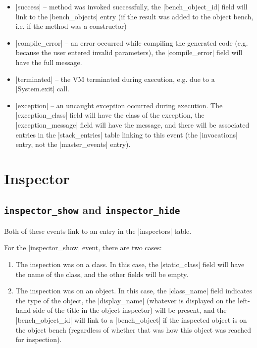 \documentclass{book}
\begin{document}
\begin{itemize}
\item |success| -- method was invoked successfully, the |bench_object_id|
  field will link to the |bench_objects| entry (if the result was added to the
  object bench, i.e. if the method was a constructor)
\item |compile_error| -- an error occurred while compiling the generated code
  (e.g. because the user entered invalid parameters), the |compile_error|
  field will have the full message.
\item |terminated| -- the VM terminated during execution, e.g. due to a
  |System.exit| call.
\item |exception| -- an uncaught exception occurred during execution.  The
  |exception_class| field will have the class of the exception, the
  |exception_message| field will have the message, and there will be
  associated entries in the |stack_entries| table linking to this event (the
  |invocations| entry, not the |master_events| entry).
\end{itemize}

\section{Inspector}


\subsection{\lstinline|inspector_show| and \lstinline|inspector_hide|}

Both of these events link to an entry in the |inspectors| table.

For the |inspector_show| event, there are two cases:

\begin{enumerate}
\item The inspection was on a class.  In this case, the |static_class| field
  will have the name of the class, and the other fields will be empty.
\item The inspection was on an object.  In this case, the |class_name| field
  indicates the type of the object, the |display_name| (whatever is displayed
  on the left-hand side of the title in the object inspector) will be present,
  and the |bench_object_id| will link to a |bench_object| if the inspected
  object is on the object bench (regardless of whether that was how this
  object was reached for inspection).
\end{enumerate}
\end{document}
